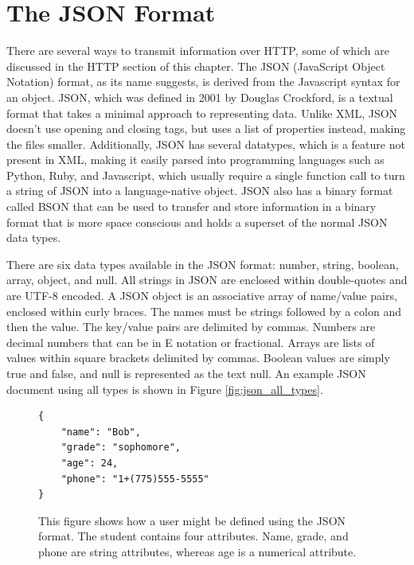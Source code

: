 \section{The JSON Format}

There are several ways to transmit information over HTTP, some of which are discussed in the HTTP section of this chapter. The JSON (JavaScript Object Notation) format, as its name suggests, is derived from the Javascript syntax for an object. JSON, which was defined in 2001 by Douglas Crockford, is a textual format that takes a minimal approach to representing data\cite{bray2013json}. Unlike XML, JSON doesn't use opening and closing tags, but uses a list of properties instead, making the files smaller\cite{nurseitov2009comparison}. Additionally, JSON has several datatypes, which is a feature not present in XML, making it easily parsed into programming languages such as Python, Ruby, and Javascript, which usually require a single function call to turn a string of JSON into a language-native object. JSON also has a binary format called BSON that can be used to transfer and store information in a binary format that is more space conscious and holds a superset of the normal JSON data types\cite{chodorow2013mongodb}.

There are six data types available in the JSON format: number, string, boolean, array, object, and null\cite{bray2013json}. All strings in JSON are enclosed within double-quotes and are UTF-8 encoded. A JSON object is an associative array of name/value pairs, enclosed within curly braces. The names must be strings followed by a colon and then the value. The key/value pairs are delimited by commas. Numbers are decimal numbers that can be in E notation or fractional. Arrays are lists of values within square brackets delimited by commas. Boolean values are simply true and false, and null is represented as the text null. An example JSON document using all types is shown in Figure \ref{fig:json_all_types}.

\begin{figure}
\begin{center}
\begin{lstlisting}
{
    "name": "Bob",
    "grade": "sophomore",
    "age": 24,
    "phone": "1+(775)555-5555"
}
\end{lstlisting}
\caption[JSON User Example]{This figure shows how a user might be defined using the JSON format. The student contains four attributes. Name, grade, and phone are string attributes, whereas age is a numerical attribute.\label{fig:json_example}}
\end{center}
\end{figure}

